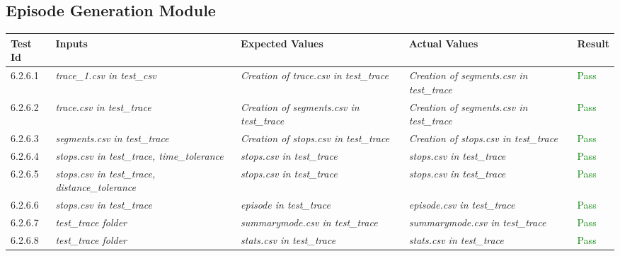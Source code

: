 \documentclass[12pt, titlepage]{article}
\begin{document}
\subsection{Episode Generation Module}
\begin{tabular}{ | m{3.5em} | m{4cm}| m{4cm} | m{4cm} | m{1.2cm} | } 
  \hline
  \textbf{Test Id}& \textbf{Inputs} & \textbf{Expected Values} & \textbf{Actual Values} & \textbf{Result} \\ 
  \hline
   6.2.6.1 & \textit{trace\_1.csv in test\_csv} & \textit{Creation of trace.csv in test\_trace} & \textit{Creation of segments.csv in test\_trace} & \textcolor{green}{Pass} \\ 
  \hline
  6.2.6.2 & \textit{trace.csv in test\_trace} & \textit{Creation of segments.csv in test\_trace} & \textit{Creation of segments.csv in test\_trace} & \textcolor{green}{Pass} \\ 
  \hline
  6.2.6.3 & \textit{segments.csv in test\_trace} & \textit{Creation of stops.csv in test\_trace} & \textit{Creation of stops.csv in test\_trace} & \textcolor{green}{Pass} \\  
  \hline
  6.2.6.4 & \textit{stops.csv in test\_trace, time\_tolerance} & \textit{stops.csv in test\_trace} & \textit{stops.csv in test\_trace} & \textcolor{green}{Pass} \\  
  \hline
   6.2.6.5 & \textit{stops.csv in test\_trace, distance\_tolerance} & \textit{stops.csv in test\_trace} & \textit{stops.csv in test\_trace} & \textcolor{green}{Pass} \\
  \hline
   6.2.6.6 & \textit{stops.csv in test\_trace} & \textit{episode in test\_trace} & \textit{episode.csv in test\_trace} & \textcolor{green}{Pass} \\ 
   \hline
   6.2.6.7 & \textit{test\_trace folder} & \textit{summarymode.csv in test\_trace} & \textit{summarymode.csv in test\_trace} & \textcolor{green}{Pass} \\ 
   \hline
   6.2.6.8 & \textit{test\_trace folder} & \textit{stats.csv in test\_trace} & \textit{stats.csv in test\_trace} & \textcolor{green}{Pass} \\ 
   \hline
\end{tabular}
\end{document}
